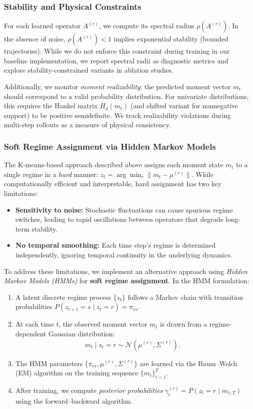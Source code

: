 \documentclass[journal, onecolumn]{IEEEtran}
\begin{document}
\subsubsection{Stability and Physical Constraints}

For each learned operator $A^{(r)}$, we compute its spectral radius $\rho(A^{(r)})$. In the absence of noise, $\rho(A^{(r)}) < 1$ implies exponential stability (bounded trajectories). While we do not enforce this constraint during training in our baseline implementation, we report spectral radii as diagnostic metrics and explore stability-constrained variants in ablation studies.

Additionally, we monitor \emph{moment realizability}: the predicted moment vector $m_t$ should correspond to a valid probability distribution. For univariate distributions, this requires the Hankel matrix $H_d(m_t)$ (and shifted variant for nonnegative support) to be positive semidefinite. We track realizability violations during multi-step rollouts as a measure of physical consistency.

\subsubsection{Soft Regime Assignment via Hidden Markov Models}

The K-means-based approach described above assigns each moment state $m_t$ to a single regime in a \emph{hard} manner: $z_t = \arg\min_r \|m_t - \mu^{(r)}\|$. While computationally efficient and interpretable, hard assignment has two key limitations:
\begin{itemize}
    \item \textbf{Sensitivity to noise:} Stochastic fluctuations can cause spurious regime switches, leading to rapid oscillations between operators that degrade long-term stability.
    \item \textbf{No temporal smoothing:} Each time step's regime is determined independently, ignoring temporal continuity in the underlying dynamics.
\end{itemize}

To address these limitations, we implement an alternative approach using \emph{Hidden Markov Models (HMMs)} for \textbf{soft regime assignment}. In the HMM formulation:
\begin{enumerate}
    \item A latent discrete regime process $\{z_t\}$ follows a Markov chain with transition probabilities $P(z_{t+1} = s \mid z_t = r) = \pi_{rs}$.
    \item At each time $t$, the observed moment vector $m_t$ is drawn from a regime-dependent Gaussian distribution:
    \[
    m_t \mid z_t = r \sim \mathcal{N}(\mu^{(r)}, \Sigma^{(r)}).
    \]
    \item The HMM parameters $\{\pi_{rs}, \mu^{(r)}, \Sigma^{(r)}\}$ are learned via the Baum--Welch (EM) algorithm on the training sequence $\{m_t\}_{t=1}^T$.
    \item After training, we compute \emph{posterior probabilities} $\gamma_t^{(r)} = P(z_t = r \mid m_{1:T})$ using the forward--backward algorithm.
\end{enumerate}
\end{document}
